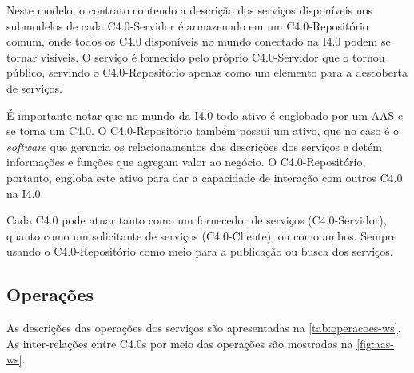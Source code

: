 Neste modelo, o contrato contendo a descrição dos serviços disponíveis nos submodelos de cada C4.0-Servidor é armazenado em um C4.0-Repositório comum, onde todos os C4.0 disponíveis no mundo conectado na I4.0 podem se tornar visíveis. O serviço é fornecido pelo próprio C4.0-Servidor que o tornou público, servindo o C4.0-Repositório apenas como um elemento para a descoberta de serviços.

É importante notar que no mundo da I4.0 todo ativo é englobado por um AAS e se torna um C4.0. O C4.0-Repositório também possui um ativo, que no caso é o \textit{software} que gerencia os relacionamentos das descrições dos serviços e detém informações e funções que agregam valor ao negócio. O C4.0-Repositório, portanto, engloba este ativo para dar a capacidade de interação com outros C4.0 na I4.0.

Cada C4.0 pode atuar tanto como um fornecedor de serviços (C4.0-Servidor), quanto como um solicitante de serviços (C4.0-Cliente), ou como ambos. Sempre usando o C4.0-Repositório como meio para a publicação ou busca dos serviços.

\subsection{Operações}

As descrições das operações dos serviços são apresentadas na \autoref{tab:operacoes-ws}. As inter-relações entre C4.0s por meio das operações são mostradas na \autoref{fig:aas-ws}.

